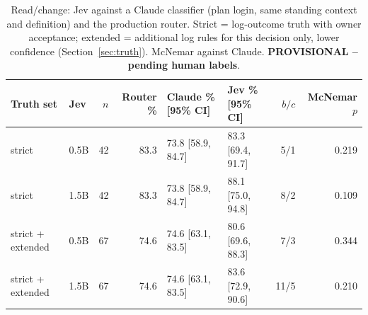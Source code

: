 \begin{table}[t]\centering\scriptsize
\caption{Read/change: Jev against a Claude classifier (plan login, same standing context and definition) and the production router. Strict = log-outcome truth with owner acceptance; extended = additional log rules for this decision only, lower confidence (Section~\ref{sec:truth}). McNemar against Claude. \textbf{PROVISIONAL -- pending human labels}.}
\label{tab:claude}
\begin{tabular}{l l r r l l r r}\toprule
Truth set & Jev & $n$ & Router \% & Claude \% [95\% CI] & Jev \% [95\% CI] & $b/c$ & McNemar $p$\\\midrule
strict & 0.5B & 42 & 83.3 & 73.8 [58.9, 84.7] & 83.3 [69.4, 91.7] & 5/1 & 0.219 \\
strict & 1.5B & 42 & 83.3 & 73.8 [58.9, 84.7] & 88.1 [75.0, 94.8] & 8/2 & 0.109 \\
strict + extended & 0.5B & 67 & 74.6 & 74.6 [63.1, 83.5] & 80.6 [69.6, 88.3] & 7/3 & 0.344 \\
strict + extended & 1.5B & 67 & 74.6 & 74.6 [63.1, 83.5] & 83.6 [72.9, 90.6] & 11/5 & 0.210 \\
\bottomrule\end{tabular}\end{table}
